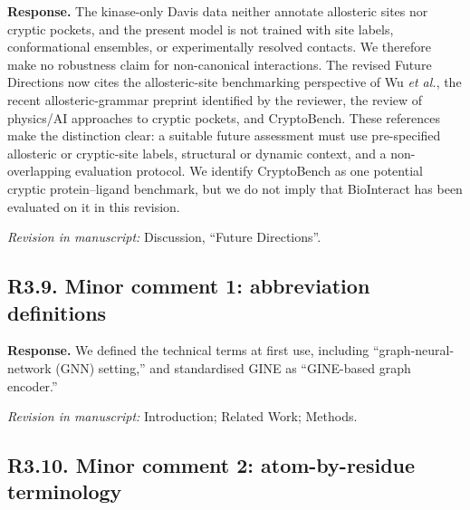 \documentclass[11pt,a4paper]{article}
\newcommand{\response}{\noindent\textbf{Response.} }
\newcommand{\change}[1]{\par\smallskip\noindent\textit{Revision in manuscript:} #1\par\medskip}
\begin{document}
\response The kinase-only Davis data neither annotate allosteric sites nor
cryptic pockets, and the present model is not trained with site labels,
conformational ensembles, or experimentally resolved contacts. We therefore make
no robustness claim for non-canonical interactions. The revised Future Directions
now cites the allosteric-site benchmarking perspective of Wu \textit{et al.},
the recent allosteric-grammar preprint identified by the reviewer, the review of
physics/AI approaches to cryptic pockets, and CryptoBench. These references make
the distinction clear: a suitable future assessment must use pre-specified
allosteric or cryptic-site labels, structural or dynamic context, and a
non-overlapping evaluation protocol. We identify CryptoBench as one potential
cryptic protein--ligand benchmark, but we do not imply that BioInteract has been
evaluated on it in this revision.

\change{Discussion, ``Future Directions''.}

\subsection*{R3.9. Minor comment 1: abbreviation definitions}


\response We defined the technical terms at first use, including
``graph-neural-network (GNN) setting,'' and standardised GINE as
``GINE-based graph encoder.''

\change{Introduction; Related Work; Methods.}

\subsection*{R3.10. Minor comment 2: atom-by-residue terminology}

\end{document}
